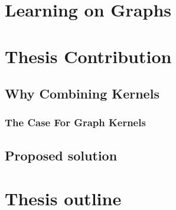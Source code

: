 \section{Learning on Graphs}


\section{Thesis Contribution}

%

\subsection{Why Combining Kernels}
\label{sec:why}

\subsubsection{The Case For Graph Kernels}

\subsection{Proposed solution}


\section{Thesis outline}


